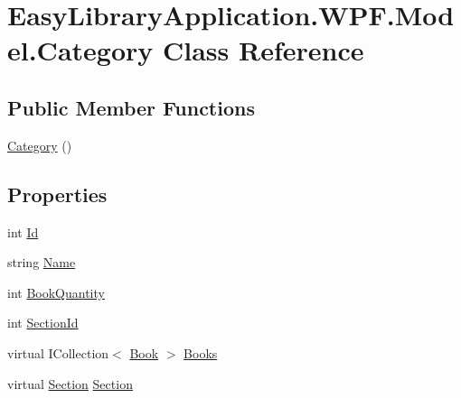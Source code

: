 \hypertarget{class_easy_library_application_1_1_w_p_f_1_1_model_1_1_category}{}\section{Easy\+Library\+Application.\+W\+P\+F.\+Model.\+Category Class Reference}
\label{class_easy_library_application_1_1_w_p_f_1_1_model_1_1_category}
\subsection*{Public Member Functions}
\begin{DoxyCompactItemize}
\item 
\mbox{\hyperlink{class_easy_library_application_1_1_w_p_f_1_1_model_1_1_category_aa33af37d3ebbaeda477d49213f05b09d}{Category}} ()
\end{DoxyCompactItemize}
\subsection*{Properties}
\begin{DoxyCompactItemize}
\item 
int \mbox{\hyperlink{class_easy_library_application_1_1_w_p_f_1_1_model_1_1_category_a15370e3411bb70fd4ee6f5aae8ec47bd}{Id}}
\item 
string \mbox{\hyperlink{class_easy_library_application_1_1_w_p_f_1_1_model_1_1_category_abce45cd25976d81fa3bbfcf19dfcda3d}{Name}}
\item 
int \mbox{\hyperlink{class_easy_library_application_1_1_w_p_f_1_1_model_1_1_category_aee28536f1ef94a0901b138ee2cbe6281}{Book\+Quantity}}
\item 
int \mbox{\hyperlink{class_easy_library_application_1_1_w_p_f_1_1_model_1_1_category_a00384f75a427ca2e8864f3886da31af7}{Section\+Id}}
\item 
virtual I\+Collection$<$ \mbox{\hyperlink{class_easy_library_application_1_1_w_p_f_1_1_model_1_1_book}{Book}} $>$ \mbox{\hyperlink{class_easy_library_application_1_1_w_p_f_1_1_model_1_1_category_a62481c5efca41193b714d955c86d1460}{Books}}
\item 
virtual \mbox{\hyperlink{class_easy_library_application_1_1_w_p_f_1_1_model_1_1_section}{Section}} \mbox{\hyperlink{class_easy_library_application_1_1_w_p_f_1_1_model_1_1_category_a65040185179bc8e10ec120c351b66198}{Section}}
\end{DoxyCompactItemize}


